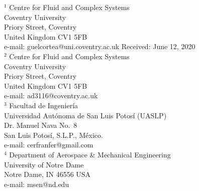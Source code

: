 \documentclass[twoside,reqno,11pt]{fcaa-var} %
\begin{document}
 \noindent
$^1$ Centre for Fluid and Complex Systems\\
Coventry University \\
Priory Street, Coventry \\
United Kingdom CV1 5FB\\[4pt]
  e-mail: guelcortea@uni.coventry.ac.uk
\hfill Received: June 12, 2020 \\[12pt]
$^2$ Centre for Fluid and Complex Systems\\
Coventry University \\
Priory Street, Coventry \\
United Kingdom CV1 5FB\\[4pt]
e-mail: ad3116@coventry.ac.uk
\hfill\\[12pt]
$^3$ Facultad de Ingenier\'{i}a\\
Universidad Aut\'{o}noma de San Luis Potos\'{i} (UASLP) \\
Dr. Manuel Nava No.\ 8 \\
San Luis Potos\'{i}, S.L.P., M\'{e}xico.\\[4pt]
e-mail: cerfranfer@gmail.com
\hfill \\[12pt]
$^4$ Department of Aerospace \& Mechanical
Engineering\\
University of Notre Dame\\
Notre Dame, IN 46556 USA \\[4pt]
e-mail: msen@nd.edu
\hfill \\[12pt]
\end{document}
